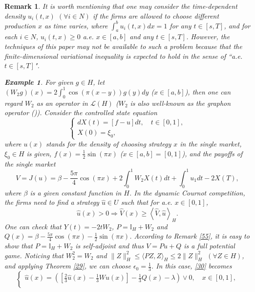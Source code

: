 \documentclass[10pt]{article}
\newtheorem{remark}{Remark}[section]
\newtheorem{example}{Example}[section]
\begin{document}
\begin{remark}\label{80}
It is worth mentioning that one may consider  the time-dependent density $u_i(t,x)$ $(\forall i\in N)$ if the firms are allowed to choose different production $x$ as  time varies, where $\int_a^bu_i(t,x)dx=1$ for any $t\in[s,T]$, and for each $i\in N$, $u_i(t,x)\geq0$ a.e. $x\in[a,b]$ and any $t\in[s,T]$. However, the techniques of this paper may not be available to such a problem because that the finite-dimensional variational inequality is expected to hold  in the sense of ``a.e. $t\in[s,T]$".

\begin{example}\label{58}
For given $g\in H$, let $(W_2g)(x)=2\int_0^1\cos(\pi(x-y))g(y)dy$ ($x\in[a,b]$),  then one can regard  $W_2$ as an  operator in $\mathcal{L}(H)$ ($W_2$ is also well-known as the graphon operator (\citep{carmona2022stochastic})). Consider the controlled state equation
\begin{equation*}
\begin{cases}
dX(t)=\left[f-u\right]dt,\quad t\in[0,1],\\
X(0)=\xi_0,
\end{cases}
\end{equation*}
where $u(x)$ stands for the density of choosing strategy $x$ in the single market, $\xi_0\in H$ is given, $f(x)=\frac{1}{2}\sin(\pi x)$ ($x\in[a,b]=[0,1]$), and the  payoffs of the single market
$$
V=J(u)=\beta-\frac{5\pi}{4}\cos(\pi x)+2\int_0^1W_2X(t)dt+\int_0^1u_1dt-2X(T),
$$
where $\beta$ is a given constant function in $H$. In the dynamic Cournot competition, the firms need to find a strategy $\widehat{u}\in U$ such that for a.e. $x\in[0,1]$,
\begin{equation}\label{43}
\widehat{u}(x)>0\Rightarrow \widehat{V}(x)\geq \left\langle \widehat{V},\widehat{u}\right\rangle_H.
\end{equation}
One can check that $Y(t)=-2tW_2$, $P=\mathbb{I}_{H}+W_2$ and $Q(x)=\beta-\frac{5\pi}{4}\cos(\pi x)-\frac{1}{2}\sin (\pi x)$.  According to Remark \ref{55}, it is easy to show that $P=\mathbb{I}_{H}+W_2$ is self-adjoint and thus $V=Pu+Q$ is a full potential game.
Noticing that $W_2^2=W_2$ and $\|Z\|^2_{H}\leq\langle PZ,Z\rangle_H\leq2\|Z\|^2_{H}$ $(\forall Z\in H)$, and applying Theorem \ref{29}, we can choose $\epsilon_0=\frac{1}{3}$. In this case, \eqref{30} becomes
  \begin{equation}\label{31}
   \begin{cases}
\widehat{u}(x)=\left(\left[\frac{2}{3}\widehat{u}(x)-\frac{1}{3}W{\widehat{u}}(x)\right]-\frac{1}{3}Q(x)-\lambda\right)\vee 0,\quad x\in[0,1],\\

\end{cases}
\end{equation}
\end{example}
\end{remark}
\end{document}
